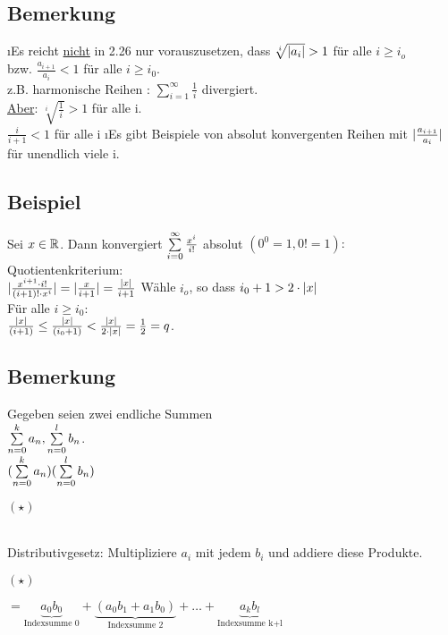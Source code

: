 \subsection{Bemerkung}
\begin{enumerate}[a)]
\i Es reicht \underline{nicht} in 2.26 nur vorauszusetzen, dass $\sqrt[i]{\abs{a_i}} > 1$ für alle $i \geq i_o$\\
bzw.  $\frac{a_{i+1}}{a_i} < 1$ für alle $i \geq i_0$.\\
z.B. harmonische Reihen : $\sum\limits_{i=1 }^{\infty} \frac{1}{i}$ divergiert.\\
\underline{Aber}: $\sqrt[i]{\frac{1}{i}} > 1$ für alle i.\\
\hspace*{30pt} $\frac{i}{i+1} < 1$ für alle i
\i Es gibt Beispiele von absolut konvergenten Reihen mit $\abs{\frac{a_{i+1}}{a_i}}$ für unendlich viele i.
\end{enumerate}
\subsection{Beispiel}
Sei $x \in \R$. Dann konvergiert $\seriesnull{\frac{x^i}{i!}}$ absolut $(0^0=1, 0! = 1):$\\
Quotientenkriterium:\\
$\abs{\frac{x^{i+1} \cd i!}{(i+1)! \cd x^i}} = \abs{\frac{x}{i+1}} = \frac{\abs{x}}{i+1}$ Wähle $i_o$, so dass $i_0 + 1 > 2 \cd \abs{x}$\\
Für alle $i \geq i_0$:\\
$\frac{\abs{x}}{(i+1)} \leq \frac{\abs{x}}{(i_0+1)} < \frac{\abs{x}}{2 \cd \abs{x}} = \frac{1}{2} = q$.
\subsection{Bemerkung}
Gegeben seien zwei endliche Summen\\
$\seriesalg{a_n}{k}{n=0}, \seriesalg{b_n}{l}{n=0}$.\\
$(\seriesalg{a_n}{k}{n=0})(\seriesalg{b_n}{l}{n=0})$
\begin{huge}
$(\star)$
\end{huge}\\
Distributivgesetz: Multipliziere $a_i$ mit jedem $b_i$ und addiere diese Produkte.\\
\begin{huge}
$(\star)$
\end{huge}
$= \underbrace{a_0 b_0}_{\text{Indexsumme 0}} + \underbrace{(a_0b_1+ a_1b_0)}_{\text{Indexsumme 2}} + \ldots + \underbrace{a_kb_l}_{\text{Indexsumme k+l}}$

